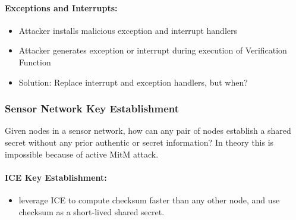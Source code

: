 \paragraph{Exceptions and Interrupts:}
\begin{itemize}
    \item Attacker installs malicious exception and interrupt handlers
    \item Attacker generates exception or interrupt during execution of Verification Function
    \item Solution: Replace interrupt and exception handlers, but when?
\end{itemize}{}

\subsubsection{Sensor Network Key Establishment}
Given nodes in a sensor network, how can any pair of nodes establish a shared secret without any prior authentic or secret information? In theory this is impossible because of active MitM attack.

\paragraph{ICE Key Establishment:}
\begin{itemize}
    \item leverage ICE to compute checksum faster than any other node, and use checksum as a short-lived shared secret.
\end{itemize}{}